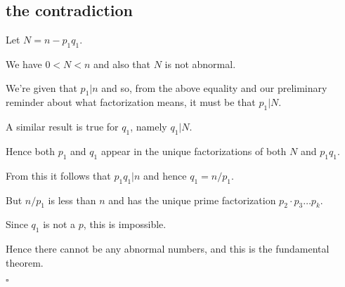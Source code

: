 \documentclass[11pt, oneside]{article}
\begin{document}
\subsection*{the contradiction} 

Let $N = n - p_1 q_1$.

We have $0 < N < n$ and also that $N$ is not abnormal.

We're given that $p_1 | n$ and so, from the above equality and our preliminary reminder about what factorization means, it must be that $p_1 | N$.

A similar result is true for $q_1$, namely $q_1 | N$.  

Hence both $p_1$ and $q_1$ appear in the unique factorizations of both $N$ and $p_1 q_1$.

From this it follows that $p_1 q_1 | n$ and hence $q_1 = n/p_1$.  

But $n/p_1$ is less than $n$ and has the unique prime factorization $p_2 \cdot p_3 \dots p_k$.

Since $q_1$ is not a $p$, this is impossible.  

Hence there cannot be any abnormal numbers, and this is the fundamental theorem.

$\square$
\end{document}
